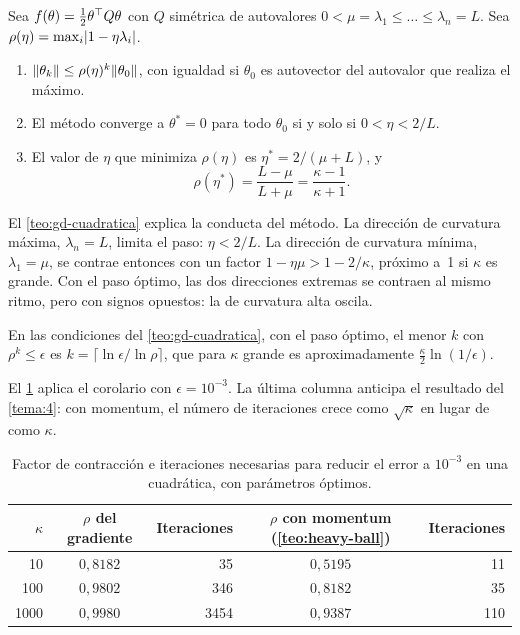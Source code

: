 \addtocounter{definicion}{1}%

\begin{teorema}\label{teo:gd-cuadratica}
Sea $f(\theta)=\tfrac12\theta^{\top} Q\theta$ con $Q$ simétrica de autovalores $0<\mu=\lambda_1\le\dots\le\lambda_n=L$. Sea $\rho(\eta)=\max_i\lvert1-\eta\lambda_i\rvert$.
\begin{enumerate}
  \item $\lVert\theta_k\rVert\le\rho(\eta)^{k}\lVert\theta_0\rVert$, con igualdad si $\theta_0$ es autovector del autovalor que realiza el máximo.
  \item El método converge a $\theta^{\ast}=0$ para todo $\theta_0$ si y solo si $0<\eta<2/L$.
  \item El valor de $\eta$ que minimiza $\rho(\eta)$ es $\eta^{\ast}=2/(\mu+L)$, y
  \[
  \rho(\eta^{\ast})=\frac{L-\mu}{L+\mu}=\frac{\kappa-1}{\kappa+1}.
  \]
\end{enumerate}
\end{teorema}

\begin{observacion}
El \cref{teo:gd-cuadratica} explica la conducta del método. La dirección de curvatura máxima, $\lambda_n=L$, limita el paso: $\eta<2/L$. La dirección de curvatura mínima, $\lambda_1=\mu$, se contrae entonces con un factor $1-\eta\mu>1-2/\kappa$, próximo a~1 si $\kappa$ es grande. Con el paso óptimo, las dos direcciones extremas se contraen al mismo ritmo, pero con signos opuestos: la de curvatura alta oscila.
\end{observacion}

\addtocounter{definicion}{1}%

\addtocounter{figure}{1}%

\begin{corolario}\label{cor:iter-cuadratica}
En las condiciones del \cref{teo:gd-cuadratica}, con el paso óptimo, el menor $k$ con $\rho^{k}\le\epsilon$ es $k=\lceil\ln\epsilon/\ln\rho\rceil$, que para $\kappa$ grande es aproximadamente $\frac{\kappa}{2}\ln(1/\epsilon)$.
\end{corolario}

El \cref{tab:kappa} aplica el corolario con $\epsilon=10^{-3}$. La última columna anticipa el resultado del \cref{tema:4}: con momentum, el número de iteraciones crece como $\sqrt\kappa$ en lugar de como $\kappa$.

\begin{table}[h]
\centering\small
\caption{Factor de contracción e iteraciones necesarias para reducir el error a $10^{-3}$ en una cuadrática, con parámetros óptimos.}\label{tab:kappa}
\begin{tabular}{@{}rcrcr@{}}
\toprule
$\kappa$ & $\rho$ del gradiente & Iteraciones & $\rho$ con momentum (\cref{teo:heavy-ball}) & Iteraciones \\
\midrule
10 & $0{,}8182$ & 35 & $0{,}5195$ & 11 \\
100 & $0{,}9802$ & 346 & $0{,}8182$ & 35 \\
1000 & $0{,}9980$ & 3454 & $0{,}9387$ & 110 \\
\bottomrule
\end{tabular}
\end{table}

